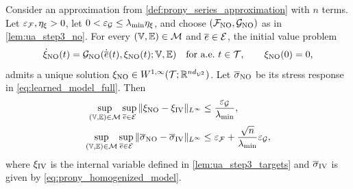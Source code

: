 {\begin{proposition}\label{prop:ua_step3_stability}
{\color{blue}Consider an approximation from \cref{def:prony_series_approximation} with $n$ terms}. Let $\varepsilon_{{\mathcal{F}}},\eta_\xi>0$, let $0<\varepsilon_{{\mathcal{G}}}\le\lambda_{\min}\eta_\xi$, and choose $({\mathcal{F}}_{\rm NO},{\mathcal{G}}_{\rm NO})$ as in \cref{lem:ua_step3_no}. For every $(\mathbb{V},\mathbb{E})\in{\mathcal{M}}$ and $\overline e\in{\mathcal{E}}$, the initial value problem
\begin{equation*}
\dot\xi_{\rm NO}(t)=\cG_{\rm NO}(\dot{\overline e}(t),\xi_{\rm NO}(t);\bV,\bE)\quad\text{for a.e.\ }t\in\cT,\qquad\xi_{\rm NO}(0)=0,
\end{equation*}
{\color{blue}admits a unique solution $\xi_{\rm NO}\in W^{1,\infty}({\mathcal{T}};\mathbb{R}^{nd_{{\mathcal{V}}^2}})$}. Let $\overline\sigma_{\rm NO}$ be its stress response in \cref{eq:learned_model_full}. Then
\begin{equation}\label{eq:ua_err}
\begin{aligned}
\sup_{(\mathbb{V},\mathbb{E})\in{\mathcal{M}}}\sup_{\overline e\in{\mathcal{E}}}\|\xi_{\rm NO}-\xi_{\rm IV}\|_{L^\infty}&\le\frac{\varepsilon_{{\mathcal{G}}}}{\lambda_{\min}},\\
\sup_{(\mathbb{V},\mathbb{E})\in{\mathcal{M}}}\sup_{\overline e\in{\mathcal{E}}}\|\overline\sigma_{\rm NO}-\overline\sigma_{\rm IV}\|_{L^\infty}&\le\varepsilon_{{\mathcal{F}}}+\frac{\sqrt n}{\lambda_{\min}}\varepsilon_{{\mathcal{G}}},
\end{aligned}
\end{equation}
where $\xi_{\rm IV}$ is the internal variable defined in \cref{lem:ua_step3_targets} and $\overline\sigma_{\rm IV}$ is given by \cref{eq:prony_homogenized_model}.
\end{proposition}}

